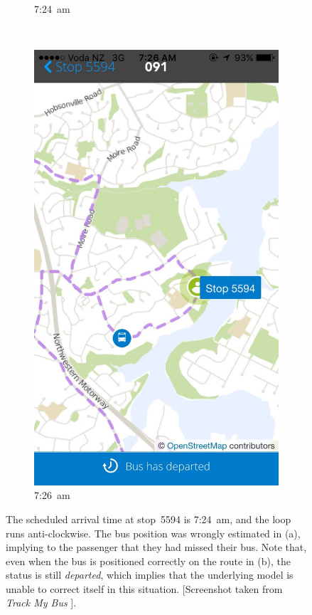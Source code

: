 \documentclass[12pt,a4paper]{article}
\begin{document}
\begin{figure}[bt]
\begin{subfigure}{0.4\textwidth}
    \caption{7:24~am}
    \label{fig:colwill-loop-1}
  \end{subfigure}
  ~
  \begin{subfigure}{0.4\textwidth}
    \includegraphics[width=\textwidth,trim={0 0 0 15cm},clip]{bus-loop-durp2.jpg}
    \caption{7:26~am}
    \label{fig:colwill-loop-2}
  \end{subfigure}
  \caption{%
    The scheduled arrival time at stop~5594 is 7:24~am,
    and the loop runs anti-clockwise.
    The bus position was wrongly estimated in (a),
    implying to the passenger that they had missed their bus.
    Note that, even when the bus is positioned correctly on the route in (b),
    the status is still \emph{departed},
    which implies that the underlying model is unable to correct itself in this situation.\newline
    \footnotesize{[Screenshot taken from \emph{Track My Bus} \citep{trackmybus}].}}
  \label{fig:colwill-loop}
\end{figure}
\end{document}
